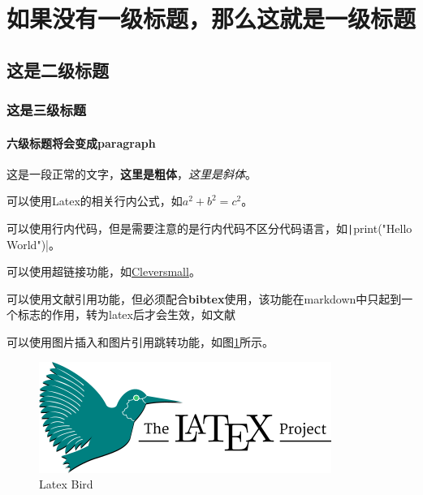 \documentclass{ctexart} %
\begin{document}
\section{如果没有一级标题，那么这就是一级标题}

\subsection{这是二级标题}

\subsubsection{这是三级标题}

\paragraph{六级标题将会变成paragraph}

\par 这是一段正常的文字，\textbf{这里是粗体}，\textit{这里是斜体}。

\par 可以使用Latex的相关行内公式，如$a^2+b^2=c^2$。

\par 可以使用行内代码，但是需要注意的是行内代码不区分代码语言，如\texttt|print("Hello World")|。

\par 可以使用超链接功能，如\href{https://www.cleversmall.com}{Cleversmall}。

\par 可以使用文献引用功能，但必须配合\textbf{bibtex}使用，该功能在markdown中只起到一个标志的作用，转为latex后才会生效，如文献\cite{name2024paper}

\par 可以使用图片插入和图片引用跳转功能，如图\ref{fig1}所示。

\begin{figure}[ht]
    \centering
    \includegraphics[width=\textwidth]{./figure/latex_bird.png}
    \caption{Latex Bird}
    \label{fig1}
\end{figure}
\end{document}
